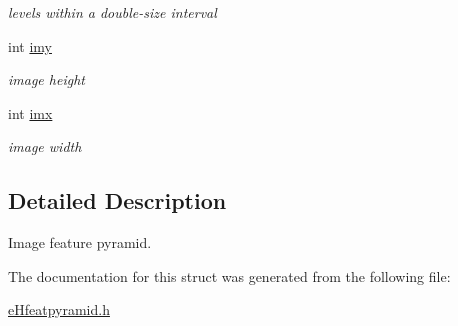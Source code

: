 \begin{DoxyCompactItemize}
\begin{DoxyCompactList}\small\item\em levels within a double-\/size interval \end{DoxyCompactList}\item 
\hypertarget{structeHfeatpyramid_af7f6662affda72ae365a893b4470c42c}{int \hyperlink{structeHfeatpyramid_af7f6662affda72ae365a893b4470c42c}{imy}}\label{structeHfeatpyramid_af7f6662affda72ae365a893b4470c42c}

\begin{DoxyCompactList}\small\item\em image height \end{DoxyCompactList}\item 
\hypertarget{structeHfeatpyramid_abbdd67ef8d05ec9276b8b129c6e0c6a9}{int \hyperlink{structeHfeatpyramid_abbdd67ef8d05ec9276b8b129c6e0c6a9}{imx}}\label{structeHfeatpyramid_abbdd67ef8d05ec9276b8b129c6e0c6a9}

\begin{DoxyCompactList}\small\item\em image width \end{DoxyCompactList}\end{DoxyCompactItemize}


\subsection{Detailed Description}
Image feature pyramid. 

The documentation for this struct was generated from the following file\-:\begin{DoxyCompactItemize}
\item 
\hyperlink{eHfeatpyramid_8h}{e\-Hfeatpyramid.\-h}\end{DoxyCompactItemize}
